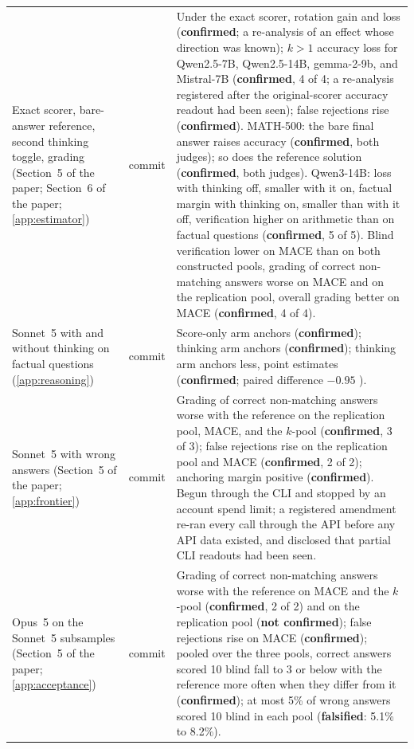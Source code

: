 {\begin{longtable}{L{3.2cm}L{1.1cm}L{8.7cm}}
Exact scorer, bare-answer reference, second thinking toggle, grading (Section~5 of the paper; Section~6 of the paper; \cref{app:estimator}) & commit & Under the exact scorer, rotation gain and loss (\textbf{confirmed}; a re-analysis of an effect whose direction was known); $k{>}1$ accuracy loss for Qwen2.5-7B, Qwen2.5-14B, gemma-2-9b, and Mistral-7B (\textbf{confirmed}, 4 of 4; a re-analysis registered after the original-scorer accuracy readout had been seen); false rejections rise (\textbf{confirmed}). MATH-500: the bare final answer raises accuracy (\textbf{confirmed}, both judges); so does the reference solution (\textbf{confirmed}, both judges). Qwen3-14B: loss with thinking off, smaller with it on, factual margin with thinking on, smaller than with it off, verification higher on arithmetic than on factual questions (\textbf{confirmed}, 5 of 5). Blind verification lower on \textsc{MACE} than on both constructed pools, grading of correct non-matching answers worse on \textsc{MACE} and on the replication pool, overall grading better on \textsc{MACE} (\textbf{confirmed}, 4 of 4). \\
Sonnet~5 with and without thinking on factual questions (\cref{app:reasoning}) & commit & Score-only arm anchors (\textbf{confirmed}); thinking arm anchors (\textbf{confirmed}); thinking arm anchors less, point estimates (\textbf{confirmed}; paired difference $-0.95$ ). \\
Sonnet~5 with wrong answers (Section~5 of the paper; \cref{app:frontier}) & commit & Grading of correct non-matching answers worse with the reference on the replication pool, \textsc{MACE}, and the $k$-pool (\textbf{confirmed}, 3 of 3); false rejections rise on the replication pool and \textsc{MACE} (\textbf{confirmed}, 2 of 2); anchoring margin positive (\textbf{confirmed}). Begun through the CLI and stopped by an account spend limit; a registered amendment re-ran every call through the API before any API data existed, and disclosed that partial CLI readouts had been seen. \\
Opus~5 on the Sonnet~5 subsamples (Section~5 of the paper; \cref{app:acceptance}) & commit & Grading of correct non-matching answers worse with the reference on \textsc{MACE} and the $k$-pool (\textbf{confirmed}, 2 of 2) and on the replication pool (\textbf{not confirmed}); false rejections rise on \textsc{MACE} (\textbf{confirmed}); pooled over the three pools, correct answers scored 10 blind fall to 3 or below with the reference more often when they differ from it (\textbf{confirmed}); at most 5\% of wrong answers scored 10 blind in each pool (\textbf{falsified}: 5.1\% to 8.2\%). \\

\end{longtable}}
